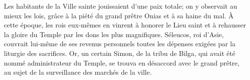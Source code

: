 Les habitants de la Ville sainte jouissaient d’une paix totale;
	on y observait au mieux les lois,
	grâce à la piété du grand prêtre Onias et à sa haine du mal.
À cette époque, les rois eux-mêmes en vinrent à honorer le Lieu saint
	et à rehausser la gloire du Temple par les dons les plus magnifiques.
Séleucos, roi d’Asie, couvrait lui-même de ses revenus personnels
		toutes les dépenses exigées par la liturgie des sacrifices.
Or, un certain Simon, de la tribu de Bilga, qui avait été nommé administrateur du Temple,
	se trouva en désaccord avec le grand prêtre,
	au sujet de la surveillance des marchés de la ville.
